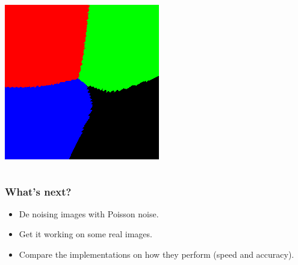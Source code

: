 \documentclass{beamer}
\begin{document}
\begin{frame}
\begin{columns}[c]
        \includegraphics[scale=0.2]{nn.png}
    \end{columns}
\end{frame}

\begin{frame}
    \frametitle{What's next?}

    \begin{itemize}
        \item De noising images with Poisson noise.
        \item Get it working on some real images.
        \item Compare the implementations on how they perform (speed and accuracy).
    \end{itemize}
\end{frame}
\end{document}
